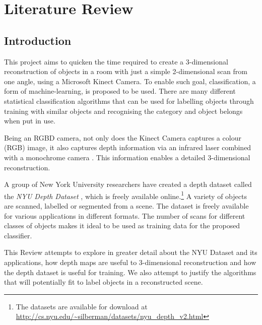 \documentclass[lit_review.tex]{subfiles}
\begin{document}





\chapter{Literature Review}
\section{Introduction}
This project aims to quicken the time required to create a 3-dimensional reconstruction of objects in a room with just a simple 2-dimensional scan from one angle, using a Microsoft Kinect Camera. To enable such goal, classification, a form of machine-learning, is proposed to be used. There are many different statistical classification algorithms that can be used for labelling objects through training with similar objects and recognising the category and object belongs when put in use. 

Being an RGBD camera, not only does the Kinect Camera captures a colour (RGB) image, it also captures depth information via an infrared laser combined with a monochrome camera \cite{kinect-doc}. This information enables a detailed 3-dimensional reconstruction.

A group of New York University researchers have created a depth dataset called the \textit{NYU Depth Dataset} \cite{nyu-dataset}, which is freely available online.\footnote{The datasets are available for download at \url{http://cs.nyu.edu/~silberman/datasets/nyu_depth_v2.html}} A variety of objects are scanned, labelled or segmented from a scene. The dataset is freely available for various applications in different formats. The number of scans for different classes of objects makes it ideal to be used as training data for the proposed classifier. 

This Review attempts to explore in greater detail about the NYU Dataset and its applications, how depth maps are useful to 3-dimensional reconstruction and how the depth dataset is useful for training. We also attempt to justify the algorithms that will potentially fit to label objects in a reconstructed scene.
\end{document}
